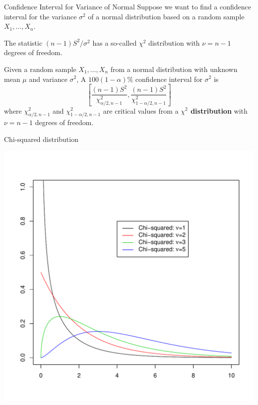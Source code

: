 \documentclass[handout]{beamer}
\renewcommand{\emph}{\textbf}
\begin{document}
\begin{frame}{Confidence Interval for Variance of Normal}
Suppose we want to find a confidence interval for the variance $\sigma^2$ of a normal distribution based on a random sample $X_1,\dots,X_n$.

\pause \vspace{.2cm}
The statistic $(n-1)S^2/\sigma^2$ has a so-called $\chi^2$ distribution with $\nu=n-1$ degrees of freedom.

\pause \begin{block}{}
Given a random sample $X_1,\dots,X_n$ from a normal distribution with unknown mean $\mu$ and variance $\sigma^2$,
A $100(1-\alpha)\%$ confidence interval for $\sigma^2$ is
$$\left[\frac{(n-1)S^2}{\chi^2_{\alpha/2,n-1}}, \frac{(n-1)S^2}{\chi^2_{1-\alpha/2,n-1}}\right]$$
where $\chi^2_{\alpha/2,n-1}$ and $\chi^2_{1-\alpha/2,n-1}$ are critical values from a \emph{$\chi^2$ distribution} with $\nu=n-1$ degrees of freedom.
\end{block}
\end{frame}

\begin{frame}{Chi-squared distribution}
\vspace{-1cm}
\begin{center}
\includegraphics[scale=.5]{chisq.pdf}
\end{center}
\end{frame}
\end{document}
